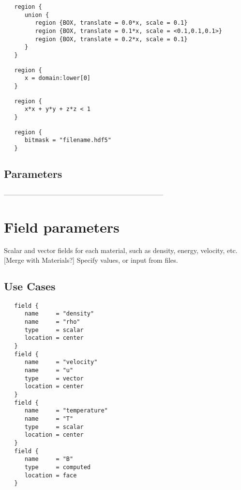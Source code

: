 \documentclass{book}
\begin{document}
\begin{verbatim}
   region {
      union {
         region {BOX, translate = 0.0*x, scale = 0.1}
         region {BOX, translate = 0.1*x, scale = <0.1,0.1,0.1>}
         region {BOX, translate = 0.2*x, scale = 0.1}
      }
   }
\end{verbatim}

\begin{verbatim}
   region {
      x = domain:lower[0]
   }
\end{verbatim}

\begin{verbatim}
   region {
      x*x + y*y + z*z < 1
   }
\end{verbatim}

\begin{verbatim}
   region {
      bitmask = "filename.hdf5"
   }
\end{verbatim}


\subsection{Parameters}%
-----------------------------------------------------------------------

\section{Field parameters} \label{s:field}

Scalar and vector fields for each material, such as
 density, energy, velocity, etc.  [Merge with Materials?]  Specify
 values, or input from files.

\subsection{Use Cases}
\begin{verbatim}
   field {
      name     = "density"
      name     = "rho"
      type     = scalar
      location = center
   }
   field {
      name     = "velocity"
      name     = "u"
      type     = vector
      location = center
   }
   field {
      name     = "temperature"
      name     = "T"
      type     = scalar
      location = center
   }
   field {
      name     = "B"
      type     = computed
      location = face
   }
\end{verbatim}
\end{document}
